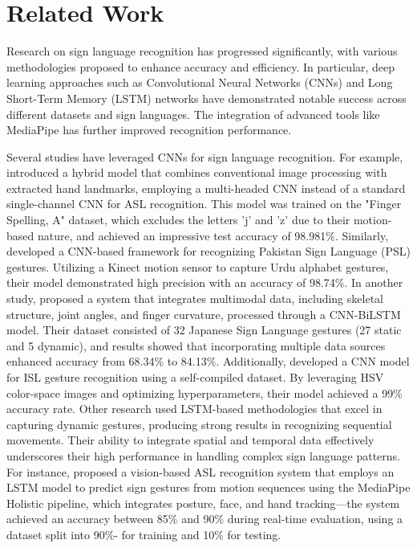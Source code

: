 \documentclass[preprint,12pt,authoryear]{elsarticle}
\begin{document}
\section{Related Work}
Research on sign language recognition has progressed significantly, with various methodologies proposed to enhance accuracy and efficiency. In particular, deep learning approaches such as Convolutional Neural Networks (CNNs) and Long Short-Term Memory (LSTM) networks have demonstrated notable success across different datasets and sign languages. The integration of advanced tools like MediaPipe has further improved recognition performance.

Several studies have leveraged CNNs for sign language recognition. For example, \cite{Yasmin} introduced a hybrid model that combines conventional image processing with extracted hand landmarks, employing a multi-headed CNN instead of a standard single-channel CNN for ASL recognition. This model was trained on the "Finger Spelling, A" dataset, which excludes the letters 'j' and 'z' due to their motion-based nature, and achieved an impressive test accuracy of 98.981\%.
Similarly, \cite{Arooj24} developed a CNN-based framework for recognizing Pakistan Sign Language (PSL) gestures. Utilizing a Kinect motion sensor to capture Urdu alphabet gestures, their model demonstrated high precision with an accuracy of 98.74\%.
In another study, \cite{Lu23} proposed a system that integrates multimodal data, including skeletal structure, joint angles, and finger curvature, processed through a CNN-BiLSTM model. Their dataset consisted of 32 Japanese Sign Language gestures (27 static and 5 dynamic), and results showed that incorporating multiple data sources enhanced accuracy from 68.34\% to 84.13\%.
Additionally, \cite{Vashisth23} developed a CNN model for ISL gesture recognition using a self-compiled dataset. By leveraging HSV color-space images and optimizing hyperparameters, their model achieved a 99\% accuracy rate.
 Other research used LSTM-based methodologies that excel in capturing dynamic gestures, producing strong results in recognizing sequential movements. Their ability to integrate spatial and temporal data effectively underscores their high performance in handling complex sign language patterns.
For instance, \cite{Rao} proposed a vision-based ASL recognition system that employs an LSTM model to predict sign gestures from motion sequences using the MediaPipe Holistic pipeline, which integrates posture, face, and hand tracking—the system achieved an accuracy between 85\% and 90\% during real-time evaluation, using a dataset split into 90\%- for training and 10\% for testing.
\end{document}
